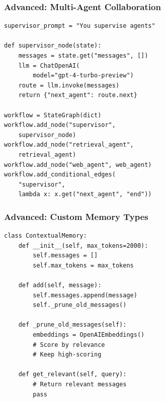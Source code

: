 \documentclass[aspectratio=169,11pt]{beamer}
\begin{document}
\begin{frame}[fragile]
  \frametitle{Advanced: Multi-Agent Collaboration}

  \begin{lstlisting}
supervisor_prompt = "You supervise agents"

def supervisor_node(state):
    messages = state.get("messages", [])
    llm = ChatOpenAI(
        model="gpt-4-turbo-preview")
    route = llm.invoke(messages)
    return {"next_agent": route.next}

workflow = StateGraph(dict)
workflow.add_node("supervisor",
    supervisor_node)
workflow.add_node("retrieval_agent",
    retrieval_agent)
workflow.add_node("web_agent", web_agent)
workflow.add_conditional_edges(
    "supervisor",
    lambda x: x.get("next_agent", "end"))
  \end{lstlisting}
\end{frame}

\begin{frame}[fragile]
  \frametitle{Advanced: Custom Memory Types}

  \begin{lstlisting}
class ContextualMemory:
    def __init__(self, max_tokens=2000):
        self.messages = []
        self.max_tokens = max_tokens

    def add(self, message):
        self.messages.append(message)
        self._prune_old_messages()

    def _prune_old_messages(self):
        embeddings = OpenAIEmbeddings()
        # Score by relevance
        # Keep high-scoring

    def get_relevant(self, query):
        # Return relevant messages
        pass
  \end{lstlisting}
\end{frame}
\end{document}
